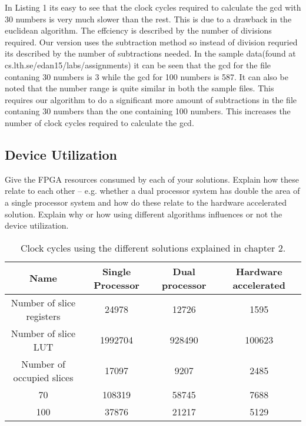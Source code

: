 \documentclass[11pt]{article}
\begin{document}
In Listing 1 its easy to see that the clock cycles required to calculate the gcd with 30 numbers is very much slower than the rest. This is due to a drawback in the euclidean algorithm. The effciency is described by the number of divisions required. Our version uses the subtraction method so instead of division requried its described by the number of subtractions needed. In the sample data(found at cs.lth.se/edan15/labs/assignments) it can be seen that the gcd for the file contaning 30 numbers is 3 while the gcd for 100 numbers is 587. It can also be noted that the number range is quite similar in both the sample files. This requires our algorithm to do a significant more amount of subtractions in the file contaning 30 numbers than the one containing 100 numbers. This increases the number of clock cycles required to calculate the gcd.




\subsection{Device Utilization}
Give the FPGA resources consumed by each of your solutions. Explain how these relate to each other -- e.g. whether a dual processor system has double the area of a single processor system and how do these relate to the hardware accelerated solution. Explain why or how using different algorithms influences or not the device utilization.


\begin{table}[htbp]
   \centering
   \begin{tabular}{@{} cccc @{}} %
      \toprule
      \cmidrule(r){1-2} %
	Name	& Single Processor	& Dual processor	& Hardware accelerated\\
      \midrule
      Number of slice registers	& 24978			& 12726			&1595\\
      Number of slice LUT	& 1992704		&  928490		&100623\\
      Number of occupied slices	& 17097			& 9207			&2485\\
      70	& 108319		& 58745			&7688\\
     100	& 37876			&  21217		&5129\\
      \bottomrule
   \end{tabular}
   \caption{Clock cycles using the different solutions explained in chapter 2.}
   \label{tab:Utilization}
\end{table}
\end{document}

